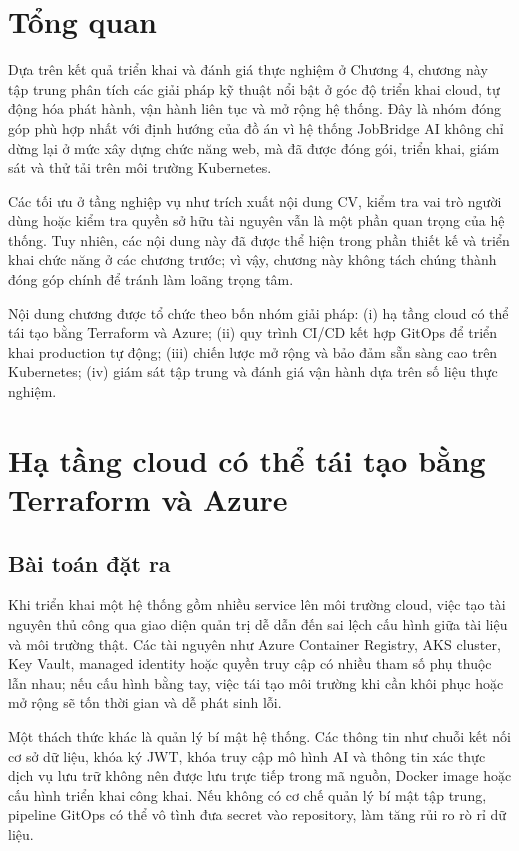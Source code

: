 \documentclass[../DoAn.tex]{subfiles}
\begin{document}
\section{Tổng quan}

Dựa trên kết quả triển khai và đánh giá thực nghiệm ở Chương 4, chương này tập trung phân tích các giải pháp kỹ thuật nổi bật ở góc độ triển khai cloud, tự động hóa phát hành, vận hành liên tục và mở rộng hệ thống. Đây là nhóm đóng góp phù hợp nhất với định hướng của đồ án vì hệ thống JobBridge AI không chỉ dừng lại ở mức xây dựng chức năng web, mà đã được đóng gói, triển khai, giám sát và thử tải trên môi trường Kubernetes.

Các tối ưu ở tầng nghiệp vụ như trích xuất nội dung CV, kiểm tra vai trò người dùng hoặc kiểm tra quyền sở hữu tài nguyên vẫn là một phần quan trọng của hệ thống. Tuy nhiên, các nội dung này đã được thể hiện trong phần thiết kế và triển khai chức năng ở các chương trước; vì vậy, chương này không tách chúng thành đóng góp chính để tránh làm loãng trọng tâm.

Nội dung chương được tổ chức theo bốn nhóm giải pháp: (i) hạ tầng cloud có thể tái tạo bằng Terraform và Azure; (ii) quy trình CI/CD kết hợp GitOps để triển khai production tự động; (iii) chiến lược mở rộng và bảo đảm sẵn sàng cao trên Kubernetes; (iv) giám sát tập trung và đánh giá vận hành dựa trên số liệu thực nghiệm.

\section{Hạ tầng cloud có thể tái tạo bằng Terraform và Azure}
\label{sec:solution-cloud-iac}

\subsection{Bài toán đặt ra}

Khi triển khai một hệ thống gồm nhiều service lên môi trường cloud, việc tạo tài nguyên thủ công qua giao diện quản trị dễ dẫn đến sai lệch cấu hình giữa tài liệu và môi trường thật. Các tài nguyên như Azure Container Registry, AKS cluster, Key Vault, managed identity hoặc quyền truy cập có nhiều tham số phụ thuộc lẫn nhau; nếu cấu hình bằng tay, việc tái tạo môi trường khi cần khôi phục hoặc mở rộng sẽ tốn thời gian và dễ phát sinh lỗi.

Một thách thức khác là quản lý bí mật hệ thống. Các thông tin như chuỗi kết nối cơ sở dữ liệu, khóa ký JWT, khóa truy cập mô hình AI và thông tin xác thực dịch vụ lưu trữ không nên được lưu trực tiếp trong mã nguồn, Docker image hoặc cấu hình triển khai công khai. Nếu không có cơ chế quản lý bí mật tập trung, pipeline GitOps có thể vô tình đưa secret vào repository, làm tăng rủi ro rò rỉ dữ liệu.
\end{document}
